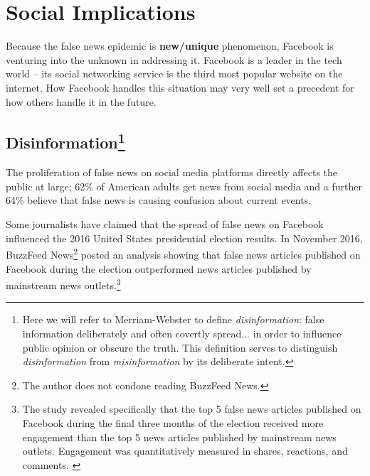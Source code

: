 
\section{Social Implications}

\par Because the false news epidemic is \textbf{new/unique} phenomenon, Facebook is venturing into the unknown in addressing it. Facebook is a leader in the tech world -- its social networking service is the third most popular website on the internet. \cite{alexa} How Facebook handles this situation may very well set a precedent for how others handle it in the future.


\subsection[Disinformation]{Disinformation\footnote{Here we will refer to Merriam-Webster to define \emph{disinformation}: false information deliberately and often covertly spread... in order to influence public opinion or obscure the truth. \cite{merriam_webster} This definition serves to distinguish \emph{disinformation} from \emph{misinformation} by its deliberate intent.}
} 

\par The proliferation of false news on social media platforms directly affects the public at large; 62\% of American adults get news from social media and a further 64\% believe that false news is causing confusion about current events. \cite{bbc_propaganda}

\par Some journalists have claimed that the spread of false news on Facebook influenced the 2016 United States presidential election results. \cite{npr_fn} In November 2016, BuzzFeed News\footnote{The author does not condone reading BuzzFeed News.} posted an analysis showing that false news articles published on Facebook during the election outperformed news articles published by mainstream news outlets.\footnote{The study revealed specifically that the top 5 false news articles published on Facebook during the final three months of the election received more engagement than the top 5 news articles published by mainstream news outlets. Engagement was quantitatively measured in shares, reactions, and comments. \cite{buzzfeed_analysis}} \cite{buzzfeed_analysis}


